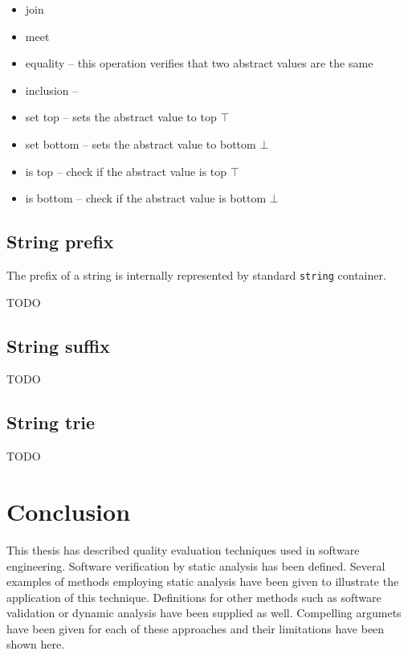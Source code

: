 \documentclass[12pt,final,oneside]{fithesis2}
\theoremstyle{definition}
\begin{document}
\begin{itemize}

\item join

\item meet

\item equality -- this operation verifies that two abstract values are the same

\item inclusion --

\item set top -- sets the abstract value to top $\top$

\item set bottom -- sets the abstract value to bottom $\bot$

\item is top -- check if the abstract value is top $\top$

\item is bottom -- check if the abstract value is bottom $\bot$

\end{itemize}


\section{String prefix}

The prefix of a string is internally represented by standard \texttt{string}
container.

TODO


\section{String suffix}

TODO

\section{String trie}

TODO

\chapter{Conclusion}
\label{chap:conclusion}

This thesis has described quality evaluation techniques used in software
engineering. Software verification by static analysis has been defined.
Several examples of methods employing static analysis have been given to
illustrate the application of this technique. Definitions for other methods
such as software validation or dynamic analysis have been supplied as well.
Compelling argumets have been given for each of these approaches and their
limitations have been shown here.
\end{document}
